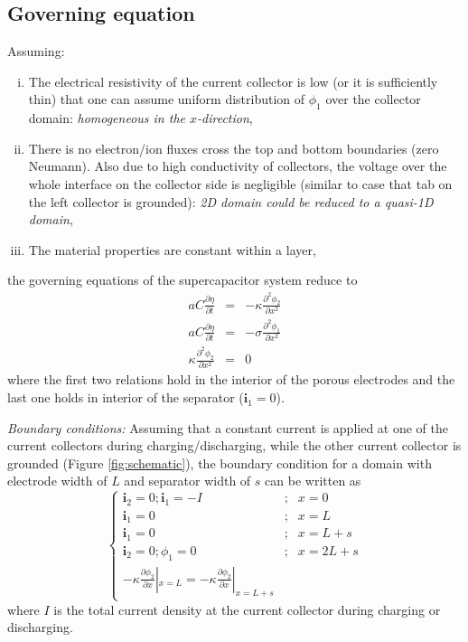 \documentclass[]{article}
\begin{document}
\subsection{Governing equation}
Assuming:
\begin{enumerate}[i.]

\item The electrical resistivity of the current collector is low (or it is sufficiently thin) that one can assume uniform distribution of $\phi_1$ over the collector domain: \textit{homogeneous in the $x$-direction}, 

\item There is no electron/ion fluxes cross the top and bottom boundaries (zero Neumann). Also due to high conductivity of collectors, the voltage over the whole interface on the collector side is negligible (similar to case that tab on the left collector is grounded): \textit{2D domain could be reduced to a quasi-1D domain},

\item The material properties are constant within a layer,

\end{enumerate}
%
the governing equations of the supercapacitor system reduce to
%
\begin{eqnarray}
aC\frac{\partial\eta}{\partial t} &=& -\kappa\frac{\partial^2\phi_2}{\partial x^2} \\ 
aC\frac{\partial\eta}{\partial t} &=& -\sigma\frac{\partial^2\phi_1}{\partial x^2} \label{eq:eta_phi1}\\ 
\kappa\frac{\partial^2\phi_2}{\partial x^2} &=& 0 
\end{eqnarray}
%
where the first two relations hold in the interior of the porous electrodes and the last one holds in interior of the separator ($\mathbf{i}_1=0$).

\textit{Boundary conditions:}
Assuming that a constant current is applied at one of the current collectors during charging/discharging, while the other current collector is grounded (Figure \ref{fig:schematic}), the boundary condition for a domain with electrode width of $L$ and separator width of $s$ can be written as
%
\begin{equation}
\left\{\begin{matrix}
\mathbf{i}_2 = 0; \mathbf{i}_1=-I & ;& x=0\\ 
\mathbf{i}_1 = 0  & ;& x=L\\ 
\mathbf{i}_1 = 0   & ;& x=L+s\\ 
\mathbf{i}_2 = 0 ; \phi_1=0 & ;& x=2L+s\\ 
-\kappa\frac{\partial\phi_2}{\partial x}|_{x=L} = -\kappa\frac{\partial\phi_2}{\partial x}|_{x=L+s} & &
\end{matrix}\right.
\end{equation}
%
where $I$ is the total current density at the current collector during charging or discharging.
\end{document}
